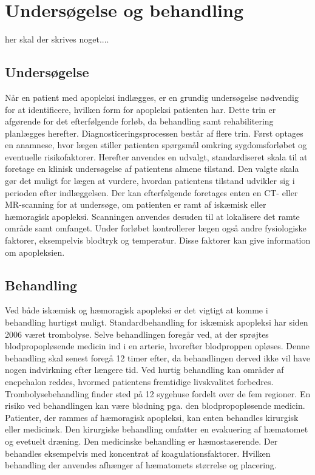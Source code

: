 \section{Undersøgelse og behandling}
her skal der skrives noget....

\subsection{Undersøgelse}
Når en patient med apopleksi indlægges, er en grundig undersøgelse nødvendig for at identificere, hvilken form for apopleksi patienten har. Dette trin er afgørende for det efterfølgende forløb, da behandling samt rehabilitering planlægges herefter.
Diagnosticeringsprocessen består af flere trin. Først optages en anamnese, hvor lægen stiller patienten spørgsmål omkring sygdomsforløbet og eventuelle risikofaktorer. Herefter anvendes en udvalgt, standardiseret skala til at foretage en klinisk undersøgelse af patientens almene tilstand. Den valgte skala gør det muligt for lægen at vurdere, hvordan patientens tilstand udvikler sig i perioden efter indlæggelsen.
Der kan efterfølgende foretages enten en CT- eller MR-scanning for at undersøge, om patienten er ramt af iskæmisk eller hæmoragisk apopleksi. Scanningen anvendes desuden til at lokalisere det ramte område samt omfanget. Under forløbet kontrollerer lægen også andre fysiologiske faktorer, eksempelvis blodtryk og temperatur. Disse faktorer kan give information om apopleksien.\cite{Sundhedsstyrelsen2009} 

\subsection{Behandling}
Ved både iskæmisk og hæmoragisk apopleksi er det vigtigt at komme i behandling hurtigst muligt. \cite{Soenderborg2013}  
Standardbehandling for iskæmisk apopleksi har siden 2006 været trombolyse. Selve behandlingen foregår ved, at der sprøjtes blodpropopløsende medicin ind i en arterie, hvorefter blodproppen opløses. Denne behandling skal senest foregå 12 timer efter, da behandlingen derved ikke vil have nogen indvirkning efter længere tid. Ved hurtig behandling kan områder af encpehalon reddes, hvormed patientens fremtidige livskvalitet forbedres. Trombolysebehandling finder sted på 12 sygehuse fordelt over de fem regioner. En risiko ved behandlingen kan være blødning pga. den blodpropopløsende medicin. \cite{Hjernesagen2015b}
Patienter, der rammes af hæmoragisk apopleksi, kan enten behandles kirurgisk eller medicinsk. Den kirurgiske behandling omfatter en evakuering af hæmatomet og evetuelt dræning. Den medicinske behandling er hæmostaserende. Der behandles eksempelvis med koncentrat af koagulationsfaktorer. Hvilken behandling der anvendes afhænger af hæmatomets størrelse og placering. \cite{Andersen2007} 


